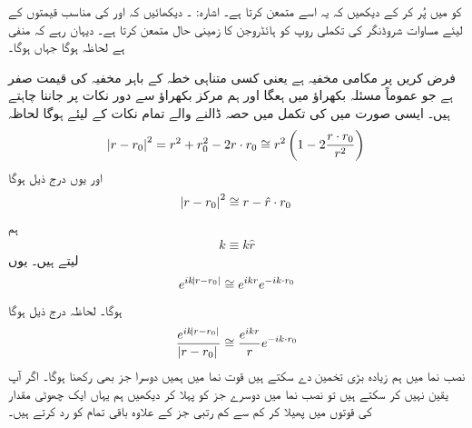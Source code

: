  کو  میں پُر کر کے دیکھیں کہ یہ اسے متمعن کرتا ہے۔ اشارہ: ۔
دیکھائیں کہ  اور  کی مناسب قیمتوں کے لیئے مساوات شروڈنگر کی تکملی روپ کو ہائڈروجن کا زمینی حال  متمعن کرتا ہے۔ دیہان رہے کہ  منفی ہے لحاظہ  ہوگا جہاں  ہوگا۔


فرض کریں  پر  مکامی مخفیہ ہے یعنی کسی متناہی خطہ کے باہر مخفیہ کی قیمت صفر ہے جو عموماً مسئلہ بکھراؤ میں ہعگا اور ہم مرکز بکھراؤ سے دور نکات پر  جاننا چاہتے ہیں۔ ایسی صورت میں  کی تکمل میں حصہ ڈالنے والے تمام نکات کے لیئے  ہوگا لحاظہ
\begin{align}
	\abs{r-r_0}^2 = r^2+r_0^2-2r\cdot r_0 \cong r^2\left(1-2\frac{r\cdot r_0}{r^2}\right)
\end{align}
اور یوں درج ذیل ہوگا
\begin{align}
	\abs{r-r_0}^2\cong r-\hat{r}\cdot r_0
\end{align}
ہم 
\begin{align}
	k\equiv k\hat{r}
\end{align}
لیتے ہیں۔ یوں
\begin{align}
	e^{ik\abs{r-r_0}}\cong e^{ikr}e^{-ik\cdot r_0}
\end{align}
ہوگا۔ لحاظہ درج ذیل ہوگا 
\begin{align}
	\frac{e^{ik\abs{r-r_0}}}{\abs{r-r_0}}\cong\frac{e^{ikr}}{r}e^{-ik\cdot r_0}
\end{align}
نصب نما میں ہم زیادہ بڑی تخمین  دے سکتے ہیں قوت نما میں ہمیں دوسرا جز بھی رکھنا ہوگا۔ اگر آپ یقین نہیں کر سکتے ہیں تو نصب نما میں دوسرے جز کو پہلا کر دیکھیں ہم یہاں ایک چھوٹی مقدار  کی قوتوں میں پھیلا کر کم سے کم رتبی جز کے علاوہ باقی تمام کو رد کرتے ہیں۔

